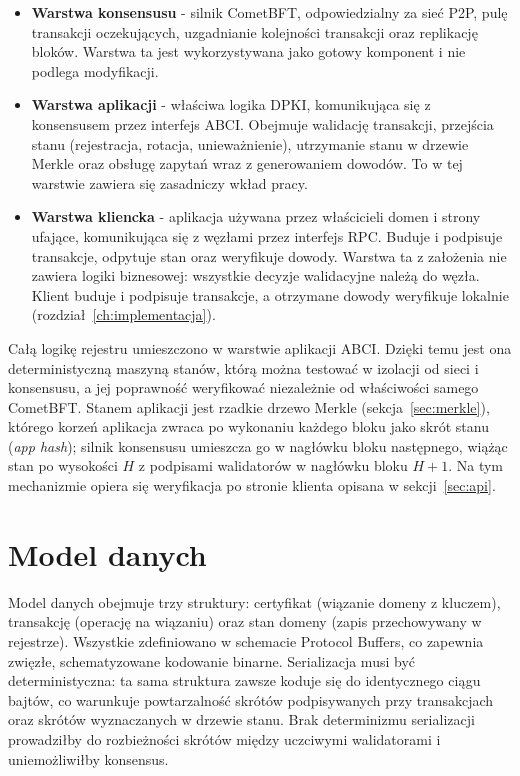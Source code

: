 \begin{itemize}
    \item \textbf{Warstwa konsensusu} - silnik CometBFT, odpowiedzialny za sieć P2P, pulę transakcji oczekujących, uzgadnianie kolejności transakcji oraz replikację bloków. Warstwa ta jest wykorzystywana jako gotowy komponent i nie podlega modyfikacji.
    \item \textbf{Warstwa aplikacji} - właściwa logika DPKI, komunikująca się z konsensusem przez interfejs ABCI. Obejmuje walidację transakcji, przejścia stanu (rejestracja, rotacja, unieważnienie), utrzymanie stanu w drzewie Merkle oraz obsługę zapytań wraz z generowaniem dowodów. To w tej warstwie zawiera się zasadniczy wkład pracy.
    \item \textbf{Warstwa kliencka} - aplikacja używana przez właścicieli domen i strony ufające, komunikująca się z węzłami przez interfejs RPC. Buduje i podpisuje transakcje, odpytuje stan oraz weryfikuje dowody. Warstwa ta z założenia nie zawiera logiki biznesowej: wszystkie decyzje walidacyjne należą do węzła. Klient buduje i podpisuje transakcje, a otrzymane dowody weryfikuje lokalnie (rozdział~\ref{ch:implementacja}).
\end{itemize}

Całą logikę rejestru umieszczono w warstwie aplikacji ABCI. Dzięki temu jest ona deterministyczną maszyną stanów, którą można testować w izolacji od sieci i konsensusu, a jej poprawność weryfikować niezależnie od właściwości samego CometBFT. Stanem aplikacji jest rzadkie drzewo Merkle (sekcja~\ref{sec:merkle}), którego korzeń aplikacja zwraca po wykonaniu każdego bloku jako skrót stanu (\emph{app hash}); silnik konsensusu umieszcza go w nagłówku bloku następnego, wiążąc stan po wysokości $H$ z podpisami walidatorów w nagłówku bloku $H+1$. Na tym mechanizmie opiera się weryfikacja po stronie klienta opisana w sekcji~\ref{sec:api}.

\section{Model danych}
\label{sec:model-danych}

Model danych obejmuje trzy struktury: certyfikat (wiązanie domeny z kluczem), transakcję (operację na wiązaniu) oraz stan domeny (zapis przechowywany w rejestrze). Wszystkie zdefiniowano w schemacie Protocol Buffers, co zapewnia zwięzłe, schematyzowane kodowanie binarne. Serializacja musi być deterministyczna: ta sama struktura zawsze koduje się do identycznego ciągu bajtów, co warunkuje powtarzalność skrótów podpisywanych przy transakcjach oraz skrótów wyznaczanych w drzewie stanu. Brak determinizmu serializacji prowadziłby do rozbieżności skrótów między uczciwymi walidatorami i uniemożliwiłby konsensus.


